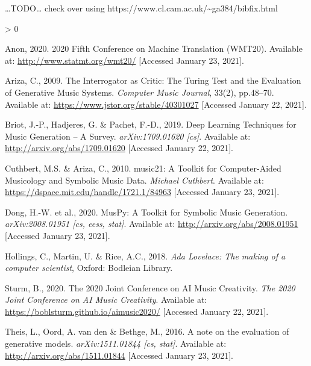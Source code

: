 \documentclass[12pt,a4paper,]{report}
\newlength{\cslhangindent}
\newenvironment{CSLReferences}[2] %
 {%
  \setlength{\parindent}{0pt}
  \ifodd #1 \everypar{\setlength{\hangindent}{\cslhangindent}}\ignorespaces\fi
  \ifnum #2 > 0
  \setlength{\parskip}{#2\baselineskip}
  \fi
 }%
 {}
\begin{document}
\ldots TODO\ldots{} check over using
https://www.cl.cam.ac.uk/\textasciitilde ga384/bibfix.html

\hypertarget{refs}{}
\begin{CSLReferences}{1}{0}
\leavevmode\hypertarget{ref-website_wmt_2020}{}%
Anon, 2020. 2020 {Fifth} {Conference} on {Machine} {Translation}
({WMT20}). Available at: \url{http://www.statmt.org/wmt20/} {[}Accessed
January 23, 2021{]}.

\leavevmode\hypertarget{ref-ariza_interrogator_2009}{}%
Ariza, C., 2009. The {Interrogator} as {Critic}: {The} {Turing} {Test}
and the {Evaluation} of {Generative} {Music} {Systems}. \emph{Computer
Music Journal}, 33(2), pp.48--70. Available at:
\url{https://www.jstor.org/stable/40301027} {[}Accessed January 22,
2021{]}.

\leavevmode\hypertarget{ref-briot_deep_2019}{}%
Briot, J.-P., Hadjeres, G. \& Pachet, F.-D., 2019. Deep {Learning}
{Techniques} for {Music} {Generation} -- {A} {Survey}.
\emph{arXiv:1709.01620 {[}cs{]}}. Available at:
\url{http://arxiv.org/abs/1709.01620} {[}Accessed January 22, 2021{]}.

\leavevmode\hypertarget{ref-cuthbert_music21_2010}{}%
Cuthbert, M.S. \& Ariza, C., 2010. music21: {A} {Toolkit} for
{Computer}-{Aided} {Musicology} and {Symbolic} {Music} {Data}.
\emph{Michael Cuthbert}. Available at:
\url{https://dspace.mit.edu/handle/1721.1/84963} {[}Accessed January 23,
2021{]}.

\leavevmode\hypertarget{ref-dong_muspy_2020}{}%
Dong, H.-W. et al., 2020. {MusPy}: {A} {Toolkit} for {Symbolic} {Music}
{Generation}. \emph{arXiv:2008.01951 {[}cs, eess, stat{]}}. Available
at: \url{http://arxiv.org/abs/2008.01951} {[}Accessed January 23,
2021{]}.

\leavevmode\hypertarget{ref-hollings_ada_2018}{}%
Hollings, C., Martin, U. \& Rice, A.C., 2018. \emph{Ada {Lovelace}: The
making of a computer scientist}, Oxford: Bodleian Library.

\leavevmode\hypertarget{ref-sturm_2020_2020}{}%
Sturm, B., 2020. The 2020 {Joint} {Conference} on {AI} {Music}
{Creativity}. \emph{The 2020 Joint Conference on AI Music Creativity}.
Available at: \url{https://boblsturm.github.io/aimusic2020/} {[}Accessed
January 22, 2021{]}.

\leavevmode\hypertarget{ref-theis_note_2016}{}%
Theis, L., Oord, A. van den \& Bethge, M., 2016. A note on the
evaluation of generative models. \emph{arXiv:1511.01844 {[}cs, stat{]}}.
Available at: \url{http://arxiv.org/abs/1511.01844} {[}Accessed January
23, 2021{]}.

\end{CSLReferences}
\end{document}
